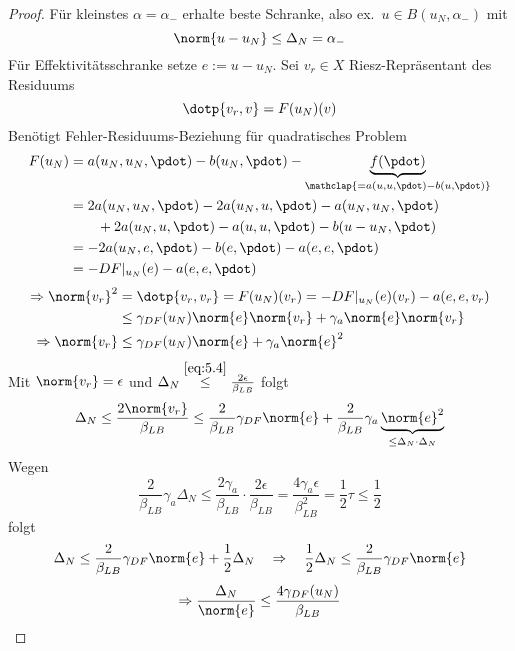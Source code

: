 \begin{proof}
	Für kleinstes $\alpha = \alpha_-$ erhalte beste Schranke, also ex.\ $u \in B(u_N,\alpha_-)$ mit
	\[
		\norm{u-u_N} \leq \Delta_N = \alpha_-
	\]
	Für Effektivitätsschranke setze $e := u-u_N$.
	Sei $v_r \in X$ Riesz-Repräsentant des Residuums
	\[
		\dotp{v_r,v} = F(u_N)(v)
	\]
	Benötigt Fehler-Residuums-Beziehung für quadratisches Problem
	\begin{align*}
		F(u_N) &= a(u_N,u_N,\pdot) - b(u_N,\pdot) - \underbrace{f(\pdot)}_{\mathclap{= a(u,u,\pdot)-b(u,\pdot)}}\\
		&= 2 a(u_N,u_N,\pdot) - 2 a(u_N,u,\pdot) - a(u_N,u_N,\pdot)\\
		&\qquad + 2 a(u_N,u,\pdot) - a(u,u,\pdot) - b(u-u_N,\pdot)\\
		&= -2 a(u_N,e,\pdot) - b(e,\pdot) - a(e,e,\pdot)\\
		&= -DF|_{u_N}(e) - a(e,e,\pdot)
	\end{align*}
	\begin{align*}
		\Rightarrow \norm{v_r}^2 &= \dotp{v_r,v_r} = F(u_N)(v_r) = -DF|_{u_N}(e)(v_r) - a(e,e,v_r)\\
		&\leq \gamma_{DF}(u_N) \norm{e} \norm{v_r} + \gamma_a \norm{e} \norm{v_r}\\
		\Rightarrow \norm{v_r} &\leq \gamma_{DF}(u_N) \norm{e} + \gamma_a \norm{e}^2
	\end{align*}
	Mit $\norm{v_r} = \epsilon$ und $\Delta_N \stackrel{\eqref{eq:5.4}}{\leq} \frac{2 \epsilon}{\beta_{LB}}$ folgt
	\[
		\Delta_N \leq \frac{2 \norm{v_r}}{\beta_{LB}} \leq \frac{2}{\beta_{LB}} \gamma_{DF} \norm{e} + \frac{2}{\beta_{LB}} \gamma_a \underbrace{\norm{e}^2}_{\leq \Delta_N \cdot \Delta_N}
	\]
	Wegen
	\[
		\frac{2}{\beta_{LB}} \gamma_a \Delta_N \leq \frac{2 \gamma_a}{\beta_{LB}} \cdot \frac{2 \epsilon}{\beta_{LB}} = \frac{4 \gamma_a \epsilon}{\beta_{LB}^2} = \frac{1}{2} \tau \leq \frac{1}{2}
	\]
	folgt
	\[
		\Delta_N \leq \frac{2}{\beta_{LB}} \gamma_{DF} \norm{e} + \frac{1}{2} \Delta_N \quad \Rightarrow \quad \frac{1}{2} \Delta_N \leq \frac{2}{\beta_{LB}} \gamma_{DF} \norm{e}
	\]
	\[
		\Rightarrow \frac{\Delta_N}{\norm{e}} \leq \frac{4 \gamma_{DF}(u_N)}{\beta_{LB}}
	\]
\end{proof}

